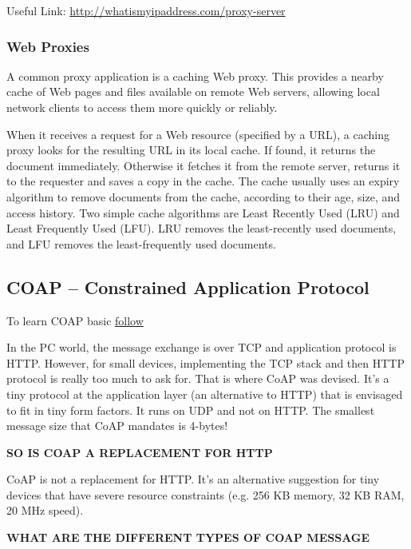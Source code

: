 \documentclass[letterpaper,10pt,english]{sphinxmanual}
\begin{document}
Useful Link: \href{http://whatismyipaddress.com/proxy-server}{http://whatismyipaddress.com/proxy-server}


\subsubsection{Web Proxies}
\label{week-10:web-proxies}
A common proxy application is a caching Web proxy. This provides a nearby cache of Web pages and files available on remote Web servers, allowing local network clients to access them more quickly or reliably.

When it receives a request for a Web resource (specified by a URL), a caching proxy looks for the resulting URL in its local cache. If found, it returns the document immediately. Otherwise it fetches it from the remote server, returns it to the requester and saves a copy in the cache. The cache usually uses an expiry algorithm to remove documents from the cache, according to their age, size, and access history. Two simple cache algorithms are Least Recently Used (LRU) and Least Frequently Used (LFU). LRU removes the least-recently used documents, and LFU removes the least-frequently used documents.


\subsection{COAP – Constrained Application Protocol}
\label{week-10:coap-constrained-application-protocol}
To learn COAP basic \href{http://www.coapsharp.com/basics-of-coap/}{follow}

In the PC world, the message exchange is over TCP and application protocol is HTTP. However, for small devices, implementing the TCP stack and then HTTP protocol is really too much to ask for. That is where CoAP was devised. It’s a tiny protocol at the application layer (an alternative to HTTP) that is envisaged to fit in tiny form factors. It runs on UDP and not on HTTP. The smallest message size that CoAP mandates is 4-bytes!

\textbf{SO IS COAP A REPLACEMENT FOR HTTP}

CoAP is not a replacement for HTTP. It’s an alternative suggestion for tiny devices that have severe resource constraints (e.g. 256 KB memory, 32 KB RAM, 20 MHz speed).

\textbf{WHAT ARE THE DIFFERENT TYPES OF COAP MESSAGE}
\end{document}

